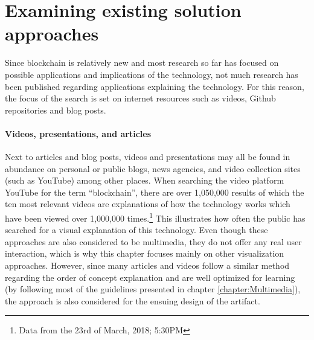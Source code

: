 \section{Examining existing solution approaches} \label{sec:ExistingSolutions}

Since blockchain is relatively new and most research so far has focused on possible applications and implications of the technology, not much research has been published regarding applications explaining the technology. For this reason, the focus of the search is set on internet resources such as videos, Github repositories and blog posts. 

\paragraph{Videos, presentations, and articles} Next to articles and blog posts, videos and presentations may all be found in abundance on personal or public blogs, news agencies, and video collection sites (such as YouTube) among other places. When searching the video platform YouTube for the term \enquote{blockchain}, there are over 1,050,000 results of which the ten most relevant videos are explanations of how the technology works which have been viewed over 1,000,000 times.\footnote{Data from the 23rd of March, 2018; 5:30PM} This illustrates how often the public has searched for a visual explanation of this technology. Even though these approaches are also considered to be multimedia, they do not offer any real user interaction, which is why this chapter focuses mainly on other visualization approaches. However, since many articles and videos follow a similar method regarding the order of concept explanation and are well optimized for learning (by following most of the guidelines presented in chapter \ref{chapter:Multimedia}), the approach is also considered for the ensuing design of the artifact.

